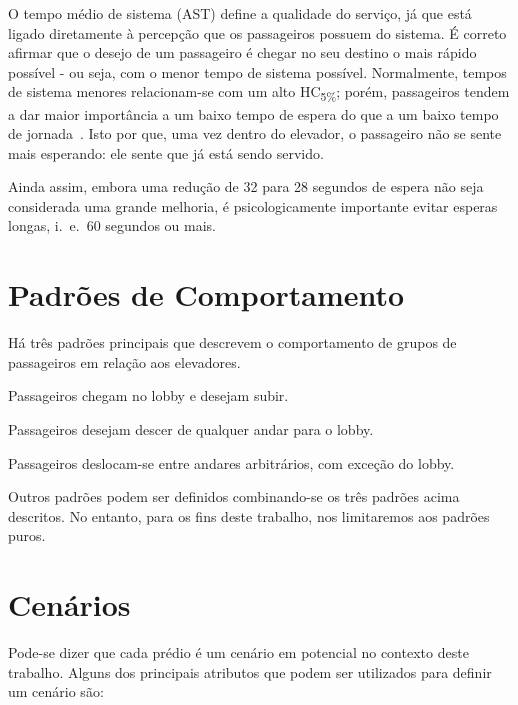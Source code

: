 O tempo médio de sistema (AST) define a qualidade do serviço, já que está ligado diretamente à percepção que os passageiros possuem do sistema. É correto afirmar que o desejo de um passageiro é chegar no seu destino o mais rápido possível - ou seja, com o menor tempo de sistema possível. Normalmente, tempos de sistema menores relacionam-se com um alto HC\textsubscript{5\%}; porém, passageiros tendem a dar maior importância a um baixo tempo de espera do que a um baixo tempo de jornada~\cite{KOEHLEROTTIGER02}. Isto por que, uma vez dentro do elevador, o passageiro não se sente mais esperando: ele sente que já está sendo servido.

{\color{red}Ainda assim, embora uma redução de 32 para 28 segundos de espera não seja considerada uma grande melhoria, é psicologicamente importante evitar esperas longas, i.~e.~60 segundos ou mais.} %

\section{Padrões de Comportamento}

Há três padrões principais que descrevem o comportamento de grupos de
passageiros em relação aos elevadores.

\begin{description}[leftmargin=!,labelwidth=\widthof{\bfseries interfloor}]
  \item[up peak]    Passageiros chegam no lobby e desejam subir.
  \item[down peak]  Passageiros desejam descer de qualquer andar para o lobby.
  \item[interfloor] Passageiros deslocam-se entre andares arbitrários, com exceção do lobby.
\end{description}

Outros padrões podem ser definidos combinando-se os três padrões acima
descritos. No entanto, para os fins deste trabalho, nos limitaremos aos padrões puros.

\section{Cenários}

Pode-se dizer que cada prédio é um cenário em potencial no contexto deste trabalho. Alguns dos principais atributos que podem ser utilizados para definir um cenário são:

